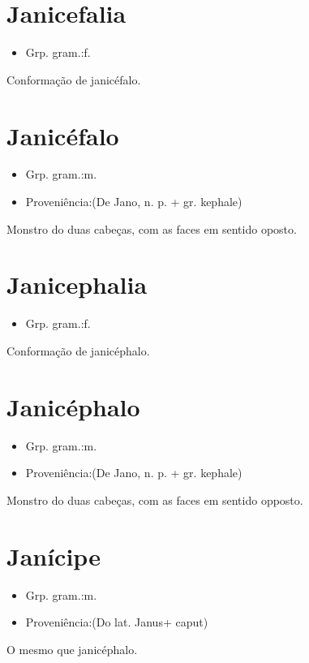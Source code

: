 \documentclass{article}
\begin{document}
\section{Janicefalia}
\begin{itemize}
\item {Grp. gram.:f.}
\end{itemize}
Conformação de janicéfalo.
\section{Janicéfalo}
\begin{itemize}
\item {Grp. gram.:m.}
\end{itemize}
\begin{itemize}
\item {Proveniência:(De \textunderscore Jano\textunderscore , n. p. + gr. \textunderscore kephale\textunderscore )}
\end{itemize}
Monstro do duas cabeças, com as faces em sentido oposto.
\section{Janicephalia}
\begin{itemize}
\item {Grp. gram.:f.}
\end{itemize}
Conformação de janicéphalo.
\section{Janicéphalo}
\begin{itemize}
\item {Grp. gram.:m.}
\end{itemize}
\begin{itemize}
\item {Proveniência:(De \textunderscore Jano\textunderscore , n. p. + gr. \textunderscore kephale\textunderscore )}
\end{itemize}
Monstro do duas cabeças, com as faces em sentido opposto.
\section{Janícipe}
\begin{itemize}
\item {Grp. gram.:m.}
\end{itemize}
\begin{itemize}
\item {Proveniência:(Do lat. \textunderscore Janus\textunderscore  + \textunderscore caput\textunderscore )}
\end{itemize}
O mesmo que \textunderscore janicéphalo\textunderscore .
\end{document}
